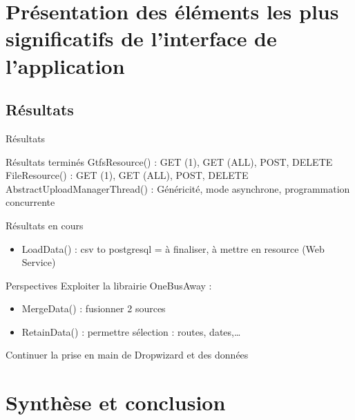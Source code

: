 \documentclass[utf8,compress]{beamer}
\begin{document}

\section{Présentation des éléments les plus significatifs de l'interface de l'application}
\subsection{Résultats}
\begin{frame}{Résultats}
\begin{block}{Résultats terminés}
GtfsResource() : GET (1), GET (ALL), POST, DELETE\\

FileResource() : GET (1), GET (ALL), POST, DELETE\\

AbstractUploadManagerThread() : Généricité, mode asynchrone, programmation concurrente
\end{block}
\begin{block}{Résultats en cours}
\begin{itemize}
\item LoadData() : csv to postgresql = à finaliser, à mettre en resource (Web Service)
\end{itemize}
\end{block}
\begin{block}{Perspectives}
Exploiter la librairie OneBusAway :
\begin{itemize}
\item MergeData() : fusionner 2 sources
\item RetainData() : permettre sélection : routes, dates,…
\end{itemize}
Continuer la prise en main de Dropwizard et des données
\end{block}
\end{frame}
\section{Synthèse et conclusion}
\end{document}
